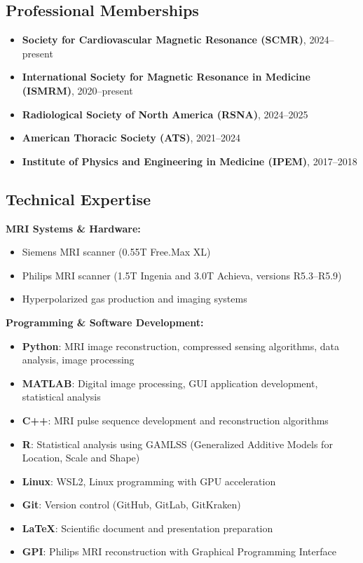 \documentclass[11pt,]{scrartcl}
\begin{document}
\subsection{Professional Memberships}

\begin{itemize}
  \leftskip-0.25in
  \item \textbf{Society for Cardiovascular Magnetic Resonance (SCMR)}, 2024--present
  \item \textbf{International Society for Magnetic Resonance in Medicine (ISMRM)}, 2020--present
  \item \textbf{Radiological Society of North America (RSNA)}, 2024--2025
  \item \textbf{American Thoracic Society (ATS)}, 2021--2024
  \item \textbf{Institute of Physics and Engineering in Medicine (IPEM)}, 2017--2018
\end{itemize}

\subsection{Technical Expertise} %

\textbf{MRI Systems \& Hardware:}
\begin{itemize}
  \leftskip-0.25in
    \item Siemens MRI scanner (0.55T Free.Max XL)
    \item Philips MRI scanner (1.5T Ingenia and 3.0T Achieva, versions R5.3--R5.9)
    \item Hyperpolarized gas production and imaging systems
\end{itemize}

\textbf{Programming \& Software Development:}
\begin{itemize}
  \leftskip-0.25in
    \item \textbf{Python}: MRI image reconstruction, compressed sensing algorithms, data analysis, image processing
    \item \textbf{MATLAB}: Digital image processing, GUI application development, statistical analysis
    \item \textbf{C++}: MRI pulse sequence development and reconstruction algorithms
    \item \textbf{R}: Statistical analysis using GAMLSS (Generalized Additive Models for Location, Scale and Shape)
    \item \textbf{Linux}: WSL2, Linux programming with GPU acceleration
    \item \textbf{Git}: Version control (GitHub, GitLab, GitKraken)
    \item \textbf{LaTeX}: Scientific document and presentation preparation
    \item \textbf{GPI}: Philips MRI reconstruction with Graphical Programming Interface
\end{itemize}
\end{document}

